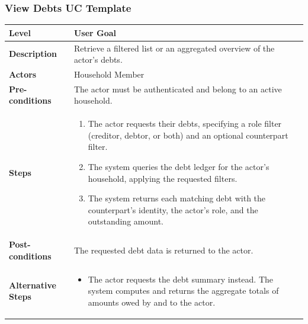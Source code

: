 \subsubsection{View Debts UC Template}
\begin{longtable}{|p{3.5cm}|p{10.3cm}|}
\hline
\rowcolor{UCRow} \textbf{Level} & User Goal \\ \hline
\textbf{Description} & Retrieve a filtered list or an aggregated overview of the actor's debts. \\ \hline
\rowcolor{UCRow} \textbf{Actors} & Household Member \\ \hline
\textbf{Pre-conditions} & The actor must be authenticated and belong to an active household. \\ \hline
\rowcolor{UCRow} \textbf{Steps} &
\begin{enumerate}[nosep, leftmargin=*]
    \item The actor requests their debts, specifying a role filter (creditor, debtor, or both) and an optional counterpart filter.
    \item The system queries the debt ledger for the actor's household, applying the requested filters.
    \item The system returns each matching debt with the counterpart's identity, the actor's role, and the outstanding amount.
\end{enumerate} \\ \hline
\textbf{Post-conditions} & The requested debt data is returned to the actor. \\ \hline
\rowcolor{UCRow} \textbf{Alternative Steps} &
\begin{itemize}[nosep, leftmargin=2.5em]
    \item[\textbf{A1.}] The actor requests the debt summary instead. The system computes and returns the aggregate totals of amounts owed by and to the actor.
\end{itemize} \\ \hline
\end{longtable}

